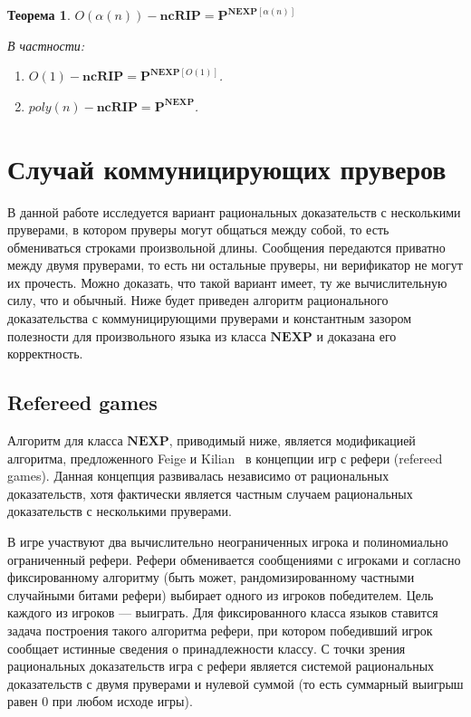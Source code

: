 \documentclass[14pt, a4paper]{extreport}
\newtheorem{theorem}{\indent Теорема}
\begin{document}
        \begin{theorem}
            $O(\alpha(n))-\textbf{ncRIP} = \textbf{P}^{\textbf{NEXP}\left[\alpha(n)\right]}$

            В частности:
            \begin{enumerate}
                \item $ O(1)-\textbf{ncRIP} = {\textbf{P}}^{\textbf{NEXP}[O(1)] }$.
                \item $\textit{poly}(n)-\textbf{ncRIP} = \textbf{P}^{\textbf{NEXP}}$.
            \end{enumerate}
        \end{theorem}


        \chapter{Случай коммуницирующих пруверов}

        В данной работе исследуется вариант рациональных доказательств с несколькими пруверами, в котором пруверы могут общаться между собой, то есть обмениваться строками произвольной длины. Сообщения передаются приватно между двумя пруверами, то есть ни остальные пруверы, ни верификатор не могут их прочесть. Можно доказать, что такой вариант имеет, ту же вычислительную силу, что и обычный. Ниже будет приведен алгоритм рационального доказательства с коммуницирующими пруверами и константным зазором полезности для произвольного языка из класса $\textbf{NEXP}$ и доказана его корректность.

        \section{Refereed games}
        Алгоритм для класса $\textbf{NEXP}$, приводимый ниже, является модификацией алгоритма, предложенного Feige и Kilian~\cite{feige1997refereed} в концепции игр с рефери (refereed games). Данная концепция развивалась независимо от рациональных доказательств, хотя фактически является частным случаем рациональных доказательств с несколькими пруверами.

        В игре участвуют два вычислительно неограниченных игрока и полиномиально ограниченный рефери. Рефери обменивается сообщениями с игроками и согласно фиксированному алгоритму (быть может, рандомизированному частными случайными битами рефери) выбирает одного из игроков победителем. Цель каждого из игроков --- выиграть. Для фиксированного класса языков ставится задача построения такого алгоритма рефери, при котором победивший игрок сообщает истинные сведения о принадлежности классу. С точки зрения рациональных доказательств игра с рефери является системой рациональных доказательств с двумя пруверами и нулевой суммой (то есть суммарный выигрыш равен $0$ при любом исходе игры).
\end{document}
